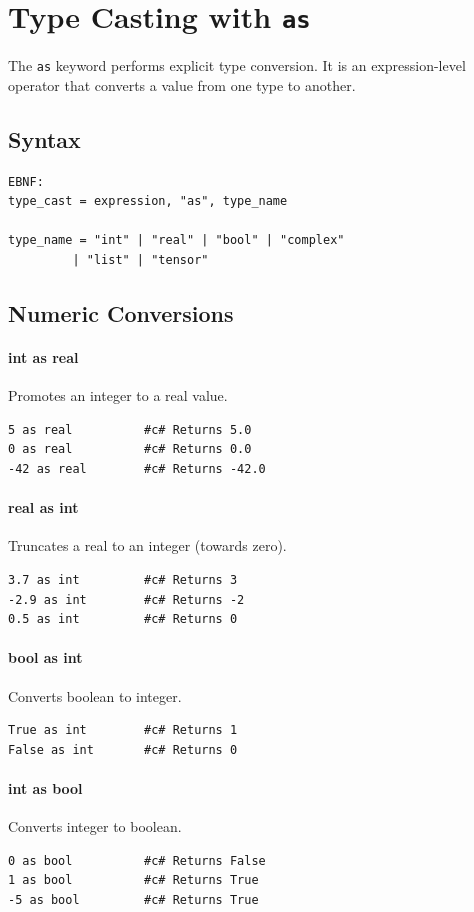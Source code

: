 \section{Type Casting with \texttt{as}}
The \texttt{as} keyword performs explicit type conversion. It is an expression-level operator that converts a value from one type to another.

\subsection{Syntax}
\begin{verbatim}
EBNF:
type_cast = expression, "as", type_name

type_name = "int" | "real" | "bool" | "complex"
         | "list" | "tensor"
\end{verbatim}

\subsection{Numeric Conversions}

\paragraph{int as real}
Promotes an integer to a real value.
\begin{verbatim}
5 as real          #c# Returns 5.0
0 as real          #c# Returns 0.0
-42 as real        #c# Returns -42.0
\end{verbatim}

\paragraph{real as int}
Truncates a real to an integer (towards zero).
\begin{verbatim}
3.7 as int         #c# Returns 3
-2.9 as int        #c# Returns -2
0.5 as int         #c# Returns 0
\end{verbatim}

\paragraph{bool as int}
Converts boolean to integer.
\begin{verbatim}
True as int        #c# Returns 1
False as int       #c# Returns 0
\end{verbatim}

\paragraph{int as bool}
Converts integer to boolean.
\begin{verbatim}
0 as bool          #c# Returns False
1 as bool          #c# Returns True
-5 as bool         #c# Returns True
\end{verbatim}


